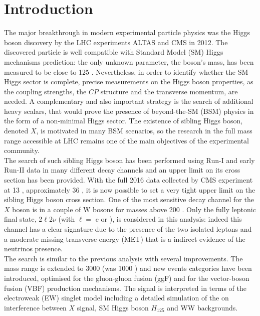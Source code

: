 \section{Introduction}\label{sec:Introduction}

The major breakthrough in modern experimental particle physics was the Higgs boson discovery by the LHC experiments ALTAS and CMS in 2012.
The discovered particle is well compatible with Standard Model (SM) Higgs
mechanisms prediction: the only unknown parameter, the boson's mass, has been
measured to be  close to 125 \GeV. Nevertheless,  in order to identify whether the SM Higgs sector is complete, precise measurements on the Higgs boson properties, as the coupling strengths, the $CP$ structure and the transverse momentum, are needed. 
A complementary and also important strategy is the search of additional heavy
scalars, that would prove the presence of  beyond-the-SM (BSM) physics in
the form of a non-minimal Higgs sector. The existence of sibling  Higgs boson,
denoted $X$, is motivated in many BSM scenarios, so the research in the full
mass range accessible at LHC remains one of the main objectives of the experimental community.\\
\newline
The search of such sibling Higgs boson has been performed using Run-I and
early Run-II data in many different decay channels and an upper limit on its
cross section has been provided. With the full 2016 data collected by CMS
experiment at 13 \TeV, approximately  36 \fbinv, it is now possible to set a very tight upper limit on the sibling Higgs boson cross section.
One of the most sensitive decay channel for the $X$ boson is in a couple of W bosons for masses above 200 \GeV. Only the fully leptonic final state, 2$\ell$2$\nu$
  (with $\ell =$ e or \PGm), is considered in this analysis: indeed this channel  has a clear signature due to the presence of the two isolated leptons and a moderate missing-transverse-energy (MET) that is a indirect evidence of the neutrinos presence.\\
\newline
The search is similar to the previous analysis \cite{CMS-PAS-HIG-16-023} with several
improvements. The mass range is extended to 3000 \GeV (was 1000 \GeV)  and new
events categories have been introduced, optimised for the gluon-gluon fusion (ggF) and for the vector-boson fusion (VBF) production mechanisms.
The signal is interpreted in terms of the electroweak (EW) singlet model
including a detailed simulation of the on interference between $X$ signal, SM Higgs boson $H_{125}$ and WW backgrounds. 
